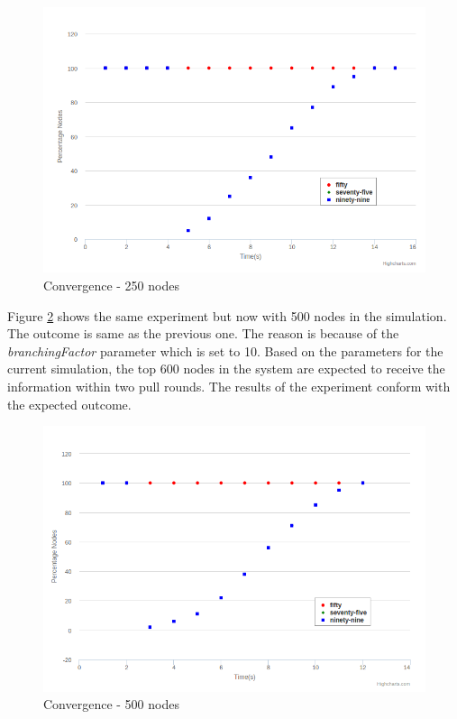 \documentclass[12pt,a4paper,twoside,openright]{book}
\begin{document}
\begin{figure}[h]
	\includegraphics[scale=0.5]{250Convergence}
	\caption{Convergence - 250 nodes}
	\label{fig:250conv}
\end{figure}


Figure \ref{fig:500conv} shows the same experiment but now with 500 nodes in the simulation. The outcome is same as the previous one. The reason is because of the \textit{branchingFactor} parameter which is set to 10. Based on the parameters for the current simulation, the top 600 nodes in the system are expected to receive the information within two pull rounds. The results of the experiment conform with the expected outcome.


\begin{figure}[h]
	\includegraphics[scale=0.5]{500Convergence}
	\caption{Convergence - 500 nodes}
	\label{fig:500conv}
\end{figure}
\end{document}
